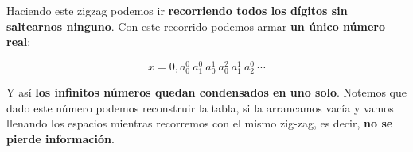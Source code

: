 \documentclass[10pt,a4paper]{article}
\begin{document}
Haciendo este zigzag podemos ir \textbf{recorriendo todos los dígitos sin saltearnos ninguno}. Con este recorrido podemos armar \textbf{un único número real}: 

\[ x = 0,a_0^0\ a_1^0\ a_0^1 \ a_0^2\ a_1^1\ a_2^0 \ \cdots \]

Y así  \textbf{los infinitos números quedan condensados en uno solo}. Notemos que dado este número podemos reconstruir la tabla, si la arrancamos vacía y vamos llenando los espacios mientras recorremos con el mismo zig-zag, es decir, \textbf{no se pierde información}.
\end{document}
